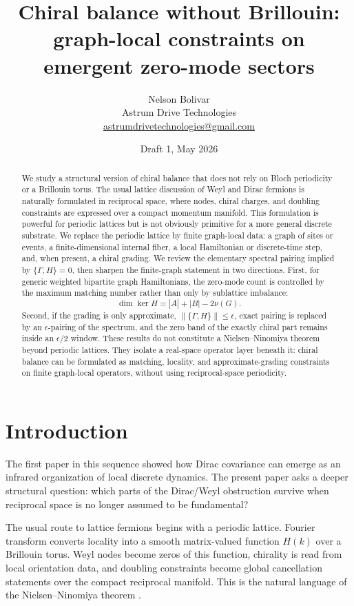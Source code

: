 \documentclass[11pt,a4paper]{article}
\title{Chiral balance without Brillouin:\\
graph-local constraints on emergent zero-mode sectors}
\author{Nelson Bolivar\\
\small Astrum Drive Technologies\\
\small \href{mailto:astrumdrivetechnologies@gmail.com}{astrumdrivetechnologies@gmail.com}}
\date{Draft 1, May 2026}
\begin{document}
\maketitle

\begin{abstract}
We study a structural version of chiral balance that does not rely on Bloch
periodicity or a Brillouin torus. The usual lattice discussion of Weyl and
Dirac fermions is naturally formulated in reciprocal space, where nodes,
chiral charges, and doubling constraints are expressed over a compact momentum
manifold. This formulation is powerful for periodic lattices but is not
obviously primitive for a more general discrete substrate. We replace the
periodic lattice by finite graph-local data: a graph of sites or events, a
finite-dimensional internal fiber, a local Hamiltonian or discrete-time step,
and, when present, a chiral grading. We review the elementary spectral pairing
implied by $\{\Gamma,H\}=0$, then sharpen the finite-graph statement in two
directions. First, for generic weighted bipartite graph Hamiltonians, the
zero-mode count is controlled by the maximum matching number rather than only
by sublattice imbalance:
\[
  \dim\ker H = |A|+|B|-2\nu(G).
\]
Second, if the grading is only approximate,
$\|\{\Gamma,H\}\|\le \epsilon$, exact pairing is replaced by an
$\epsilon$-pairing of the spectrum, and the zero band of the exactly chiral
part remains inside an $\epsilon/2$ window. These results do not constitute a
Nielsen--Ninomiya theorem beyond periodic lattices. They isolate a real-space
operator layer beneath it: chiral balance can be formulated as matching,
locality, and approximate-grading constraints on finite graph-local operators,
without using reciprocal-space periodicity.
\end{abstract}

\section{Introduction}

The first paper in this sequence showed how Dirac covariance can emerge as an
infrared organization of local discrete dynamics. The present paper asks a
deeper structural question: which parts of the Dirac/Weyl obstruction survive
when reciprocal space is no longer assumed to be fundamental?

The usual route to lattice fermions begins with a periodic lattice. Fourier
transform converts locality into a smooth matrix-valued function $H(k)$ over a
Brillouin torus. Weyl nodes become zeros of this function, chirality is read
from local orientation data, and doubling constraints become global
cancellation statements over the compact reciprocal manifold. This is the
natural language of the Nielsen--Ninomiya theorem
\cite{NielsenNinomiya1981a,NielsenNinomiya1981b}.
\end{document}
